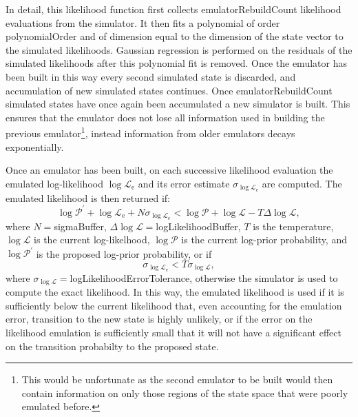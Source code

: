 In detail, this likelihood function first collects {\normalfont \ttfamily emulatorRebuildCount} likelihood evaluations from the simulator. It then fits a polynomial of order {\normalfont \ttfamily polynomialOrder} and of dimension equal to the dimension of the state vector to the simulated likelihoods. Gaussian regression is performed on the residuals of the simulated likelihoods after this polynomial fit is removed. Once the emulator has been built in this way every second simulated state is discarded, and accumulation of new simulated states continues. Once {\normalfont \ttfamily emulatorRebuildCount} simulated states have once again been accumulated a new simulator is built. This ensures that the emulator does not lose all information used in building the previous emulator\footnote{This would be unfortunate as the second emulator to be built would then contain information on only those regions of the state space that were poorly emulated before.}, instead information from older emulators decays exponentially.

Once an emulator has been built, on each successive likelihood evaluation the emulated log-likelihood $\log\mathcal{L}_\mathrm{e}$ and its error estimate $\sigma_{\log\mathcal{L}_\mathrm{e}}$ are computed. The emulated likelihood is then returned if:
\begin{equation}
\log\mathcal{P}^\prime + \log\mathcal{L}_\mathrm{e} + N \sigma_{\log\mathcal{L}_\mathrm{e}} < \log\mathcal{P} + \log\mathcal{L} - T \Delta\log\mathcal{L},
\end{equation}
where $N=${\normalfont \ttfamily sigmaBuffer}, $\Delta\log\mathcal{L}=${\normalfont \ttfamily logLikelihoodBuffer}, $T$ is the temperature, $\log\mathcal{L}$ is the current log-likelhood, $\log\mathcal{P}$ is the current log-prior probability, and $\log\mathcal{P}^\prime$ is the proposed log-prior probability, or if
\begin{equation}
\sigma_{\log\mathcal{L}_\mathrm{e}} < T \sigma_{\log\mathcal{L}},
\end{equation}
where $\sigma_{\log\mathcal{L}}=${\normalfont \ttfamily logLikelihoodErrorTolerance}, otherwise the simulator is used to compute the exact likelihood. In this way, the emulated likelihood is used if it is sufficiently below the current likelihood that, even accounting for the emulation error, transition to the new state is highly unlikely, or if the error on the likelihood emulation is sufficiently small that it will not have a significant effect on the transition probabilty to the proposed state.


